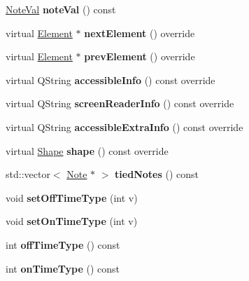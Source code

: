 \begin{DoxyCompactItemize}
\mbox{\label{class_ms_1_1_note_ac79b136dce8b0d5507183a5b1e4ab24a}} 
\hyperlink{struct_ms_1_1_note_val}{Note\+Val} {\bfseries note\+Val} () const
\item 
\mbox{\label{class_ms_1_1_note_a88cbb62e6321704dd1fa30418a80c6f9}} 
virtual \hyperlink{class_ms_1_1_element}{Element} $\ast$ {\bfseries next\+Element} () override
\item 
\mbox{\label{class_ms_1_1_note_a2858b4669f72ef90bda741577512630d}} 
virtual \hyperlink{class_ms_1_1_element}{Element} $\ast$ {\bfseries prev\+Element} () override
\item 
\mbox{\label{class_ms_1_1_note_a56844d01515ba2fb1653905f67c4409d}} 
virtual Q\+String {\bfseries accessible\+Info} () const override
\item 
\mbox{\label{class_ms_1_1_note_a46131100645d38530a6184cd57f50533}} 
virtual Q\+String {\bfseries screen\+Reader\+Info} () const override
\item 
\mbox{\label{class_ms_1_1_note_a9f44b542af9798643b1a1384e8a95d49}} 
virtual Q\+String {\bfseries accessible\+Extra\+Info} () const override
\item 
\mbox{\label{class_ms_1_1_note_a5b077f0c68de7584562198eb28e926b3}} 
virtual \hyperlink{class_ms_1_1_shape}{Shape} {\bfseries shape} () const override
\item 
\mbox{\label{class_ms_1_1_note_aebcc3e7025d9c2e4e562d09ed47ca9f6}} 
std\+::vector$<$ \hyperlink{class_ms_1_1_note}{Note} $\ast$ $>$ {\bfseries tied\+Notes} () const
\item 
\mbox{\label{class_ms_1_1_note_a6b44e75ac319c432033770dd49758c53}} 
void {\bfseries set\+Off\+Time\+Type} (int v)
\item 
\mbox{\label{class_ms_1_1_note_a043785eb081da4bc4a7c10bce41b6dad}} 
void {\bfseries set\+On\+Time\+Type} (int v)
\item 
\mbox{\label{class_ms_1_1_note_a96a70c6acc6727cfb5898df5c0d70299}} 
int {\bfseries off\+Time\+Type} () const
\item 
\mbox{\label{class_ms_1_1_note_ab8887dc08a845b1423315cbcd54c86f0}} 
int {\bfseries on\+Time\+Type} () const
\end{DoxyCompactItemize}
